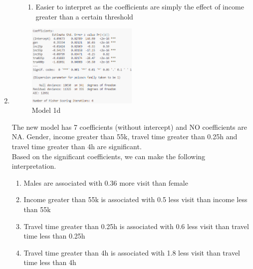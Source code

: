 \documentclass{article}
\begin{document}
\begin{enumerate}[label=(\alph*)]
\begin{enumerate}[label=(\arabic*)]
\begin{enumerate}[label=(\roman*)]
          \item
            Easier to interpret as the coefficients are simply the effect of income greater than a certain threshold

        \end{enumerate}
    \end{enumerate}

  \item
      \begin{figure}[h]
          \centering
          \includegraphics[width=0.5\textwidth]{1d.png}
          \caption{Model 1d}
      \end{figure}
    The new model has 7 coefficients (without intercept) and NO coefficients are NA. Gender, income greater than 55k, travel time greater than 0.25h and travel time greater than 4h are significant. \\

    Based on the significant coefficients, we can make the following interpretation.

    \begin{enumerate}[label=(\roman*)]
      \item Males are associated with 0.36 more visit than female
      \item Income greater than 55k is associated with 0.5 less visit than income less than 55k
      \item Travel time greater than 0.25h is associated with 0.6 less visit than travel time less than 0.25h
      \item Travel time greater than 4h is associated with 1.8 less visit than travel time less than 4h

    \end{enumerate}
  

\end{enumerate}
\end{document}
